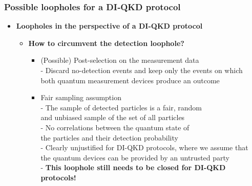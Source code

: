 \documentclass{beamer}
\begin{document}
		\begin{frame}
			\frametitle{\Large Possible loopholes for a DI‑QKD protocol}

            \vspace{3.5ex}
            \begin{itemize}
                \item \textbf{Loopholes in the perspective of a DI-QKD protocol}
                \begin{itemize}
                    \item \textbf{How to circumvent the detection loophole?}
                    \begin{itemize}
                        \small
                        \item (Possible) Post-selection on the measurement data\\
                        \footnotesize
                        - Discard no-detection events and keep only the events on which\\\hspace{0.5em}both quantum measurement devices produce an outcome
                        \vspace{0.75ex}
                        \small
                        \item Fair sampling assumption\\
                        \footnotesize
                        - The sample of detected particles is a fair, random\\\hspace{0.5em}and unbiased sample of the set of all particles\\
                        - No correlations between the quantum state of\\\hspace{0.5em}the particles and their detection probability\\
                        \vspace{1.5ex}
                        - Clearly unjustified for DI-QKD protocols, where we assume that\\\hspace{0.5em}the quantum devices can be provided by an untrusted party\\
                        \vspace{1.5ex}
                        - \textbf{This loophole still needs to be closed for DI-QKD protocols!}
                    \end{itemize}
                \end{itemize}
            \end{itemize}
		\end{frame}
\end{document}
